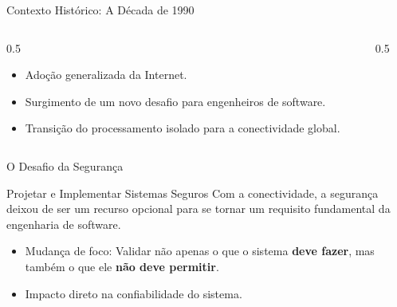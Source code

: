 \documentclass[aspectratio=169]{beamer}
\begin{document}
\begin{frame}{Contexto Histórico: A Década de 1990}
    
    \begin{columns}
        \begin{column}{0.5\textwidth}
            \begin{itemize}
                \item Adoção generalizada da Internet.
                \item Surgimento de um novo desafio para engenheiros de software.
                \item Transição do processamento isolado para a conectividade global.
            \end{itemize}
        \end{column}
        \begin{column}{0.5\textwidth}
            \centering
        \end{column}
    \end{columns}
\end{frame}

\begin{frame}{O Desafio da Segurança}
    \begin{block}{Projetar e Implementar Sistemas Seguros}
        Com a conectividade, a segurança deixou de ser um recurso opcional para se tornar um requisito fundamental da engenharia de software.
    \end{block}
    \vspace{0.5cm}
    \begin{itemize}
        \item Mudança de foco: Validar não apenas o que o sistema \textbf{deve fazer}, mas também o que ele \textbf{não deve permitir}.
        \item Impacto direto na confiabilidade do sistema.
    \end{itemize}
\end{frame}
\end{document}
